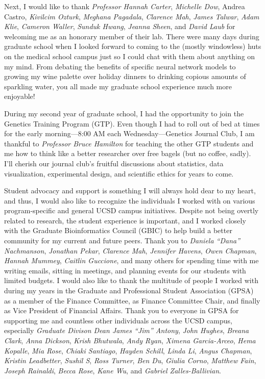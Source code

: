 \documentclass[11pt]{formatting-template}
\begin{document}
\begin{acknowledgements}
	Next, I would like to thank \textit{Professor Hannah Carter}, \textit{Michelle Dow}, Andrea Castro, \textit{Kivilcim Ozturk}, \textit{Meghana Pagadala}, \textit{Clarence Mah}, \textit{James Talwar}, \textit{Adam Klie}, \textit{Cameron Waller}, \textit{Sunduk Hwang}, \textit{Jeanna Sheen}, and \textit{David Laub} for welcoming me as an honorary member of their lab. There were many days during graduate school when I looked forward to coming to the (mostly windowless) huts on the medical school campus just so I could chat with them about anything on my mind. From debating the benefits of specific neural network models to growing my wine palette over holiday dinners to drinking copious amounts of sparkling water, you all made my graduate school experience much more enjoyable!  
	
	During my second year of graduate school, I had the opportunity to join the Genetics Training Program (GTP). Even though I had to roll out of bed at times for the early morning—8:00 AM each Wednesday—Genetics Journal Club, I am thankful to \textit{Professor Bruce Hamilton} for teaching the other GTP students and me how to think like a better researcher over free bagels (but no coffee, sadly). I’ll cherish our journal club's fruitful discussions about statistics, data visualization, experimental design, and scientific ethics for years to come.
	
	Student advocacy and support is something I will always hold dear to my heart, and thus, I would also like to recognize the individuals I worked with on various program-specific and general UCSD campus initiatives. Despite not being overtly related to research, the student experience is important, and I worked closely with the Graduate Bioinformatics Council (GBIC) to help build a better community for my current and future peers. Thank you to \textit{Daniela “Dana” Nachmanson}, \textit{Jonathan Pekar}, \textit{Clarence Mah}, \textit{Jennifer Havens}, \textit{Owen Chapman}, \textit{Hannah Mummey}, \textit{Caitlin Guccione}, and many others for spending time with me writing emails, sitting in meetings, and planning events for our students with limited budgets. I would also like to thank the multitude of people I worked with during my years in the Graduate and Professional Student Association (GPSA) as a member of the Finance Committee, as Finance Committee Chair, and finally as Vice President of Financial Affairs. Thank you to everyone in GPSA for supporting me and countless other individuals across the UCSD campus, especially \textit{Graduate Divison Dean James “Jim” Antony}, \textit{John Hughes}, \textit{Breana Clark}, \textit{Anna Dickson}, \textit{Krish Bhutwala}, \textit{Andy Ryan}, \textit{Ximena Garcia-Arceo}, \textit{Hema Kopalle}, \textit{Mia Rose}, \textit{Chiaki Santiago}, \textit{Hayden Schill}, \textit{Linda Li}, \textit{Angus Chapman}, \textit{Kristin Leadbetter}, \textit{Sushil S}, \textit{Ross Turner}, \textit{Ben Du}, \textit{Giulia Corno}, \textit{Matthew Fain}, \textit{Joseph Rainaldi}, \textit{Becca Rose}, \textit{Kane Wu}, and \textit{Gabriel Zalles-Ballivian}. 
	

\end{acknowledgements}
\end{document}
